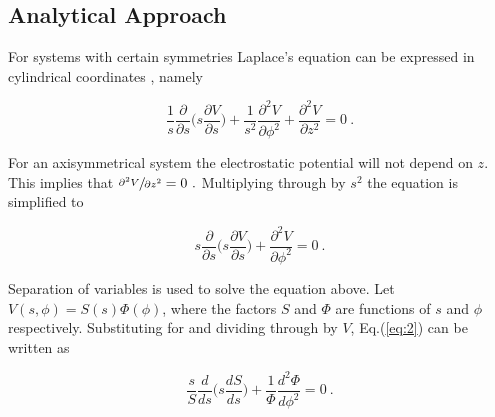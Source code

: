 \documentclass[a4paper]{jpconf}
\begin{document}
\subsection*{Analytical Approach} 

For systems with certain symmetries Laplace's equation can be expressed in cylindrical coordinates \cite{RHB-MathematicalMethods}, namely
 
\begin{equation}
\frac{1}{s}\frac{\partial}{\partial s}\bigg(s \frac{\partial V}{\partial s}\bigg) + \frac{1}{s^2} \frac{\partial^2 V}{\partial \phi^2} + \frac{\partial^2 V}{\partial z^2} = 0~.
\label{eq:1}
\end{equation}


\noindent For an axisymmetrical system the electrostatic potential will not depend on $z$. This implies that $\sfrac{\partial^2 V}{\partial z^2} = 0~.$ Multiplying through by $s^2$ the equation is simplified to

\begin{equation}
s \frac{\partial}{\partial s}\bigg(s \frac{\partial V}{\partial s}\bigg) + \frac{\partial^2 V}{\partial \phi^2} = 0~.
\label{eq:2}
\end{equation}

Separation of variables is used to solve the equation above. Let $V(s,\phi) = S(s)\Phi(\phi)$, where the factors $S$ and $\Phi$ are functions of $s$ and $\phi$ respectively. Substituting for and dividing through by $V$, Eq.(\ref{eq:2}) can be written as 

\begin{equation}
\frac{s}{S}\frac{d}{ds}\bigg(s \frac{dS}{ds}\bigg) + \frac{1}{\Phi}\frac{d^2 \Phi}{d \phi^2} = 0~.
\label{eq:3}
\end{equation}
\end{document}
